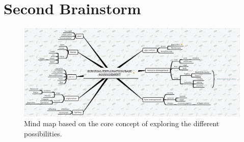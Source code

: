 \documentclass[a4paper,11pt]{report}
\begin{document}
\chapter{Second Brainstorm}
\begin{figure}[h]
    \centering
    \includegraphics[scale=0.25,angle=-90]{Images/Brainstorm2.png}
    \caption{Mind map based on the core concept of exploring the different possibilities.}
    \label{fig:brainstorm2}
\end{figure}
\end{document}
